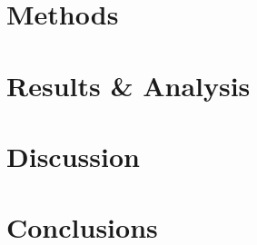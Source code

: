 \documentclass[a4paper, 11pt]{report}
\begin{document}
\chapter{Methods}


\chapter{Results \& Analysis}


\chapter{Discussion}


\chapter{Conclusions}



\clearpage

\printbibliography

\clearpage


\begin{appendices}
  
\end{appendices}













\end{document}
